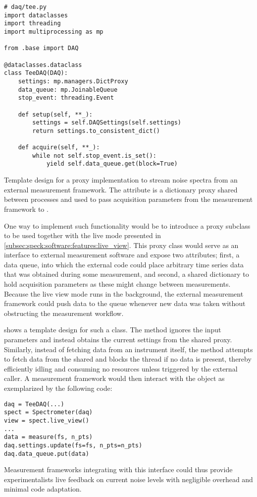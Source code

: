 \begin{marginlisting}
    \begin{verbatim}
# daq/tee.py
import dataclasses
import threading
import multiprocessing as mp

from .base import DAQ

@dataclasses.dataclass
class TeeDAQ(DAQ):
    settings: mp.managers.DictProxy
    data_queue: mp.JoinableQueue
    stop_event: threading.Event

    def setup(self, **_):
        settings = self.DAQSettings(self.settings)
        return settings.to_consistent_dict()

    def acquire(self, **_):
        while not self.stop_event.is_set():
            yield self.data_queue.get(block=True)
    \end{verbatim}
    \caption[ template]{
        Template design for a proxy  implementation to stream noise spectra from an external measurement framework.
        The  attribute is a dictionary proxy shared between processes and used to pass acquisition parameters from the measurement framework to \pyspeck.
    }
    \label{lst:speck:conclusion:tee}
\end{marginlisting}

One way to implement such functionality would be to introduce a proxy  subclass to be used together with the live mode presented in \cref{subsec:speck:software:features:live_view}.
This proxy class would serve as an interface to external measurement software and expose two attributes; first, a data queue, into which the external code could place arbitrary time series data that was obtained during some measurement, and second, a shared dictionary to hold acquisition parameters as these might change between measurements.
Because the live view mode runs in the background, the external measurement framework could push data to the queue whenever new data was taken without obstructing the measurement workflow.

 shows a template design for such a  class.
The  method ignores the input parameters and instead obtains the current settings from the shared  proxy.
Similarly, instead of fetching data from an instrument itself, the  method attempts to fetch data from the shared  and blocks the thread if no data is present, thereby efficiently idling and consuming no resources unless triggered by the external caller.
A measurement framework would then interact with the  object as exemplarized by the following code:
\begin{verbatim}
daq = TeeDAQ(...)
spect = Spectrometer(daq)
view = spect.live_view()
...
data = measure(fs, n_pts)
daq.settings.update(fs=fs, n_pts=n_pts)
daq.data_queue.put(data)
\end{verbatim}
Measurement frameworks integrating with this interface could thus provide experimentalists live feedback on current noise levels with negligible overhead and minimal code adaptation.

